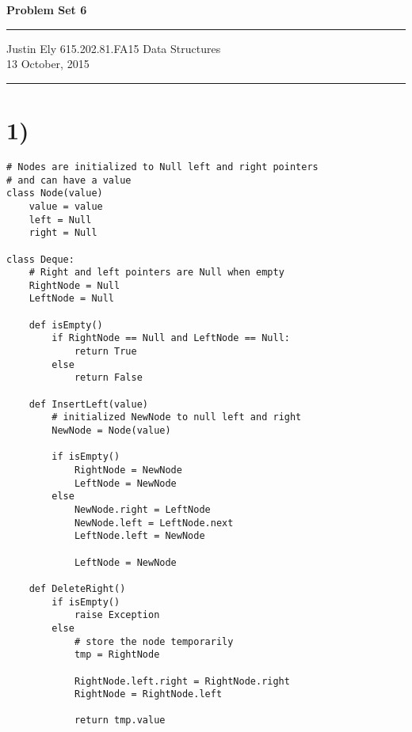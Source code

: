 \documentclass[a4paper,11pt]{article}
\begin{document}
\begin{flushright}

\vspace{1.1cm}

{\bf\Huge Problem Set 6}

\rule{0.25\linewidth}{0.5pt}

\vspace{0.5cm}
Justin Ely
\linebreak
\newline
\footnotesize{615.202.81.FA15 Data Structures \\}
\vspace{0.5cm}
13 October, 2015
\end{flushright}

\noindent\rule{\linewidth}{1.0pt}


\section*{1)}

\begin{verbatim}
# Nodes are initialized to Null left and right pointers
# and can have a value
class Node(value)
    value = value
    left = Null
    right = Null

class Deque:
    # Right and left pointers are Null when empty
    RightNode = Null
    LeftNode = Null

    def isEmpty()
        if RightNode == Null and LeftNode == Null:
            return True
        else
            return False

    def InsertLeft(value)
        # initialized NewNode to null left and right
        NewNode = Node(value)
       
        if isEmpty()
            RightNode = NewNode
            LeftNode = NewNode
        else
            NewNode.right = LeftNode
            NewNode.left = LeftNode.next            
            LeftNode.left = NewNode
            
            LeftNode = NewNode
        
    def DeleteRight()
        if isEmpty()
            raise Exception
        else
            # store the node temporarily
            tmp = RightNode

            RightNode.left.right = RightNode.right
            RightNode = RightNode.left
            
            return tmp.value
            
\end{verbatim}
\end{document}
